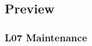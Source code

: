 %
%
%
%
%
%
%
%
%
%
%
%
%

\subsection{Preview}

\begin{frame}
	\frametitle{L07 Maintenance}
\end{frame}


\appendix

\begin{frame}[allowframebreaks]
	
	
\end{frame}



